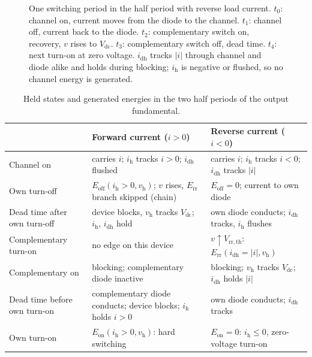 \documentclass[11pt,a4paper]{article}
\newcommand{\Eon}{E_{\mathrm{on}}}
\newcommand{\Eoff}{E_{\mathrm{off}}}
\newcommand{\Err}{E_{\mathrm{rr}}}
\newcommand{\Vdc}{V_{\mathrm{dc}}}
\newcommand{\ih}{i_{\mathrm{h}}}
\newcommand{\idh}{i_{\mathrm{dh}}}
\newcommand{\vh}{v_{\mathrm{h}}}
\begin{document}
\begin{figure}[htbp]
\caption{One switching period in the half period with reverse load current. $t_0$: channel on, current moves from the diode to the channel. $t_1$: channel off, current back to the diode. $t_2$: complementary switch on, recovery, $v$ rises to $\Vdc$. $t_3$: complementary switch off, dead time. $t_4$: next turn-on at zero voltage. $\idh$ tracks $|i|$ through channel and diode alike and holds during blocking; $\ih$ is negative or flushed, so no channel energy is generated.}
\label{fig:timing}
\end{figure}

\begin{table}[htbp]
\centering
\caption{Held states and generated energies in the two half periods of the output fundamental.}
\label{tab:halfperiods}
\small
\begin{tabularx}{\textwidth}{@{}lXX@{}}
\toprule
 & Forward current ($i>0$) & Reverse current ($i<0$) \\
\midrule
Channel on & carries $i$; $\ih$ tracks $i>0$; $\idh$ flushed & carries $i$; $\ih$ tracks $i<0$; $\idh$ tracks $|i|$ \\
Own turn-off & $\Eoff(\ih>0,\vh)$; $v$ rises, $\Err$ branch skipped (chain) & $\Eoff = 0$; current to own diode \\
Dead time after own turn-off & device blocks, $\vh$ tracks $\Vdc$; $\ih$, $\idh$ hold & own diode conducts; $\idh$ tracks, $\ih$ flushes \\
Complementary turn-on & no edge on this device & $v\uparrow V_\mathrm{rr,th}$: $\Err(\idh=|i|,\vh)$ \\
Complementary on & blocking; complementary diode inactive & blocking; $\vh$ tracks $\Vdc$; $\idh$ holds $|i|$ \\
Dead time before own turn-on & complementary diode conducts; device blocks; $\ih$ holds $i>0$ & own diode conducts; $\idh$ tracks \\
Own turn-on & $\Eon(\ih>0,\vh)$: hard switching & $\Eon = 0$: $\ih \le 0$, zero-voltage turn-on \\
\bottomrule
\end{tabularx}
\end{table}
\end{document}
